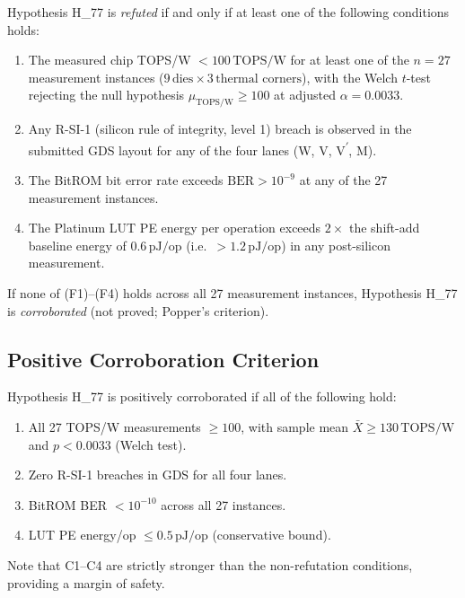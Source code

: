 Hypothesis H\_77 is \emph{refuted} if and only if at least one of the following
conditions holds:
%
\begin{enumerate}
  \item[\textbf{(F1)}] The measured chip TOPS/W $< 100\,\text{TOPS/W}$ for at
        least one of the $n = 27$ measurement instances
        ($9\,\text{dies} \times 3\,\text{thermal corners}$),
        with the Welch $t$-test rejecting the null hypothesis
        $\mu_{\text{TOPS/W}} \geq 100$ at adjusted $\alpha = 0.0033$.

  \item[\textbf{(F2)}] Any R-SI-1 (silicon rule of integrity, level 1) breach
        is observed in the submitted GDS layout for any of the four lanes
        (W, V, V\textsuperscript{$\prime$}, M).

  \item[\textbf{(F3)}] The BitROM bit error rate exceeds
        $\mathrm{BER} > 10^{-9}$ at any of the 27 measurement instances.

  \item[\textbf{(F4)}] The Platinum LUT PE energy per operation exceeds
        $2\times$ the shift-add baseline energy of $0.6\,\text{pJ/op}$
        (i.e.\ $> 1.2\,\text{pJ/op}$) in any post-silicon measurement.
\end{enumerate}
%
If none of (F1)--(F4) holds across all 27 measurement instances,
Hypothesis H\_77 is \emph{corroborated} (not proved; Popper's criterion).

\subsection{Positive Corroboration Criterion}

Hypothesis H\_77 is positively corroborated if all of the following hold:
%
\begin{enumerate}
  \item[\textbf{(C1)}] All 27 TOPS/W measurements $\geq 100$, with sample mean
        $\bar{X} \geq 130\,\text{TOPS/W}$ and $p < 0.0033$ (Welch test).
  \item[\textbf{(C2)}] Zero R-SI-1 breaches in GDS for all four lanes.
  \item[\textbf{(C3)}] BitROM BER $< 10^{-10}$ across all 27 instances.
  \item[\textbf{(C4)}] LUT PE energy/op $\leq 0.5\,\text{pJ/op}$ (conservative bound).
\end{enumerate}
%
Note that C1--C4 are strictly stronger than the non-refutation conditions,
providing a margin of safety.

